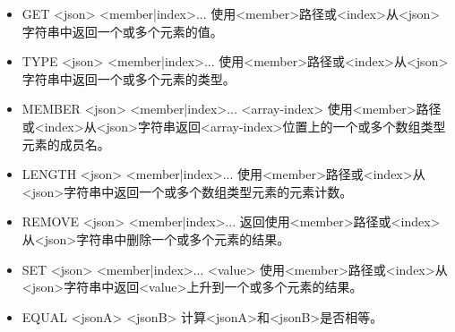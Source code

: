 \begin{itemize}
\item 
GET <json> <member|index>... 使用<member>路径或<index>从<json>字符串中返回一个或多个元素的值。

\item 
TYPE <json> <member|index>... 使用<member>路径或<index>从<json>字符串中返回一个或多个元素的类型。

\item 
MEMBER <json> <member|index>... <array-index> 使用<member>路径或<index>从<json>字符串返回<array-index>位置上的一个或多个数组类型元素的成员名。

\item 
LENGTH <json> <member|index>... 使用<member>路径或<index>从<json>字符串中返回一个或多个数组类型元素的元素计数。

\item
REMOVE <json> <member|index>... 返回使用<member>路径或<index>从<json>字符串中删除一个或多个元素的结果。

\item
SET <json> <member|index>... <value> 使用<member>路径或<index>从<json>字符串中返回<value>上升到一个或多个元素的结果。

\item
EQUAL <jsonA> <jsonB> 计算<jsonA>和<jsonB>是否相等。
\end{itemize}





















